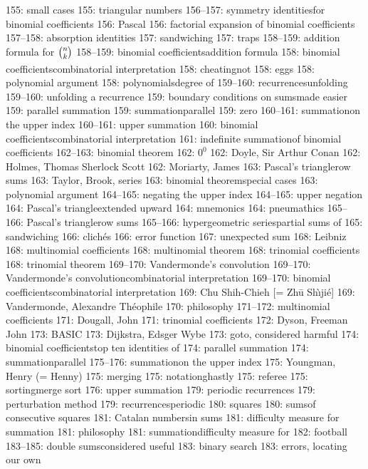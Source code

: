 155: small cases
155: triangular numbers
156--157: symmetry identities\sub for binomial coefficients
156: Pascal
156: factorial expansion of binomial coefficients
157--158: absorption identities
157: sandwiching
157: traps
158--159: addition formula for ${n\choose k}_{\mathstrut}$
158--159: binomial coefficients\sub addition formula
158: binomial coefficients\sub combinatorial interpretation
158: cheating\sub not
158: eggs
158: polynomial argument
158: polynomials\sub degree of
159--160: recurrences\sub unfolding
159--160: unfolding a recurrence
159: boundary conditions on sums\sub made easier
159: parallel summation
159: summation\sub parallel
159: zero
160--161: summation\sub on the upper index
160--161: upper summation
160: binomial coefficients\sub combinatorial interpretation
161: indefinite summation\sub of binomial coefficients
162--163: binomial theorem
162: $0^0$
162: Doyle, Sir Arthur Conan
162: Holmes, Thomas Sherlock Scott
162: Moriarty, James
163: Pascal's triangle\sub row sums
163: Taylor, Brook, series
163: binomial theorem\sub special cases
163: polynomial argument
164--165: negating the upper index
164--165: upper negation
164: Pascal's triangle\sub extended upward
164: mnemonics
164: pneumathics
165--166: Pascal's triangle\sub row sums
165--166: hypergeometric series\sub partial sums of
165: sandwiching
166: clich\'es
166: error function
167: unexpected sum
168: Leibniz
168: multinomial coefficients
168: multinomial theorem
168: trinomial coefficients
168: trinomial theorem
169--170: Vandermonde's convolution
169--170: Vandermonde's convolution\sub combinatorial interpretation
169--170: binomial coefficients\sub combinatorial interpretation
169: Chu Shih-Chieh [= Zh\=u Sh\`{\i}ji\'e]
169: Vandermonde, Alexandre Th\'eophile
170: philosophy
171--172: multinomial coefficients
171: Dougall, John
171: trinomial coefficients
172: Dyson, Freeman John
173: BASIC
173: Dijkstra, Edsger Wybe
173: goto, considered harmful
174: binomial coefficients\sub top ten identities of
174: parallel summation
174: summation\sub parallel
175--176: summation\sub on the upper index
175: Youngman, Henry (= Henny)
175: merging
175: notation\sub ghastly
175: referee
175: sorting\sub merge sort
176: upper summation
179: periodic recurrences
179: perturbation method
179: recurrences\sub periodic
180: squares
180: sums\sub of consecutive squares
181: Catalan numbers\sub in sums
181: difficulty measure for summation
181: philosophy
181: summation\sub difficulty measure for
182: football
183--185: double sums\sub considered useful
183: binary search
183: errors, locating our own
